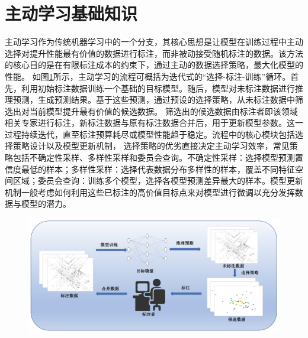 \section{主动学习基础知识}
主动学习作为传统机器学习中的一个分支，其核心思想是让模型在训练过程中主动选择对提升性能最有价值的数据进行标注，而非被动接受随机标注的数据。该方法的核心目的是在有限标注成本的约束下，通过主动的数据选择策略，最大化模型的性能。%
如图\ref{fig:2-2}所示，主动学习的流程可概括为迭代式的“选择-标注-训练”循环。首先，利用初始标注数据训练一个基础的目标模型。随后，模型对未标注数据进行推理预测，生成预测结果。基于这些预测，通过预设的选择策略，从未标注数据中筛选出对当前模型提升最有价值的候选数据。%
筛选出的候选数据由标注者即该领域相关专家进行标注，新标注数据与原有标注数据合并后，用于更新模型参数。这一过程持续迭代，直至标注预算耗尽或模型性能趋于稳定。流程中的核心模块包括选择策略设计以及模型更新机制，%
选择策略的优劣直接决定主动学习效率，常见策略包括不确定性采样、多样性采样和委员会查询。不确定性采样：选择模型预测置信度最低的样本；多样性采样：选择代表数据分布多样性的样本，覆盖不同特征空间区域；委员会查询：训练多个模型，选择各模型预测差异最大的样本。模型更新机制一般考虑如何利用这些已标注的高价值目标点来对模型进行微调以充分发挥数据与模型的潜力。%
\vspace{-0.1cm}
\begin{figure}[h]
    \centering
    \includegraphics[width = \textwidth, scale=0.5]{ljx/figure/2-2AL.pdf}
    \label{fig:2-2}
\end{figure}
